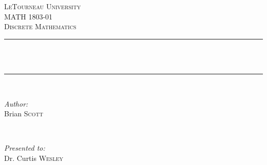 \begin{titlepage}
\newcommand{\HRule}{\rule{\linewidth}{0.4mm}} %

\center %
 

\textsc{\LARGE LeTourneau University}\\[1.5cm] %
\textsc{\Large MATH 1803-01}\\[0.5cm] %
\textsc{\large Discrete Mathematics}\\[0.5cm] %


\HRule \\[0.4cm]
\wnt\\[2mm] %
\HRule \\[3cm]

\begin{minipage}{0.35\textwidth}
	\begin{flushleft} \Large
		\emph{Author:}\\
		Brian \textsc{Scott} %
	\end{flushleft}
\end{minipage}
~
\begin{minipage}{0.35\textwidth}
	\begin{flushright} \Large
		\emph{Presented to:} \\
		Dr. Curtis \textsc{Wesley} %
	\end{flushright}
\end{minipage}\\[4cm]



\end{titlepage}

